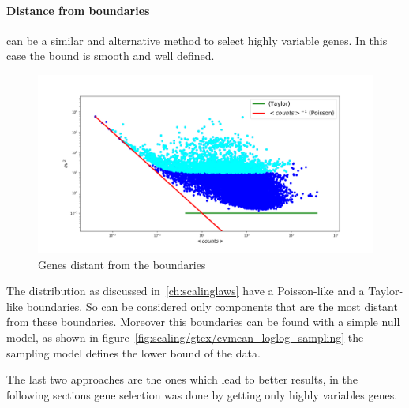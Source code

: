 \paragraph{Distance from boundaries} can be a similar and alternative method to select highly variable genes. In this case the bound is smooth and well defined.
\begin{figure}[htb!]
    \centering
    \includegraphics[width=0.8\linewidth]{pictures/topic/cvmean_oversampling.png}
    \caption{Genes distant from the boundaries}
    \label{fig:topic/cvmean_oversampling}
\end{figure}
The distribution as discussed in~\ref{ch:scalinglaws} have a Poisson-like and a Taylor-like boundaries. So can be considered only components that are the most distant from these boundaries. Moreover this boundaries can be found with a simple null model, as shown in figure~\ref{fig:scaling/gtex/cvmean_loglog_sampling} the sampling model defines the lower bound of the data.

The last two approaches are the ones which lead to better results, in the following sections gene selection was done by getting only highly variables genes.